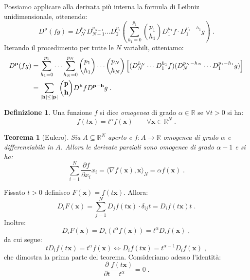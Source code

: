 \documentclass[a4paper,12pt]{report}
\theoremstyle{plain}
\newtheorem{thm}{Teorema}[section]
\theoremstyle{definition}
\newtheorem{defn}{Definizione}[section]
\theoremstyle{remark}
\numberwithin{equation}{section}
\begin{document}
Possiamo applicare alla derivata più interna la formula di Leibniz unidimensionale, ottenendo:
\begin{equation}
D^{\mathbf{p}}(fg)=D_N^{p_N}D_{N-1}^{p_{N-1}} \ldots D_2^{p_2}\left(\sum_{h_1=0}^{p_1} \binom{p_1}{h_1}D_1^{h_1}f\cdot D_1^{p_1-h_1}g\right)\;.
\end{equation}
Iterando il procedimento per tutte le $N$ variabili, otteniamo:
\begin{align}
D^{\mathbf{p}}(fg) &= \sum_{h_1=0}^{p_1}\cdots\sum_{h_N=0}^{p_N}\binom{p_1}{h_1}\cdots\binom{p_N}{h_N}\left[(D_N^{h_N}\cdots D_1^{h_1}f)(D_N^{p_N-h_N}\cdots D_1^{p_1-h_1}g)\right] \notag \\
&=\sum_{|\mathbf{h}|\le|\mathbf{p}|}\binom{\mathbf{p}}{\mathbf{h}} D^{\mathbf{h}}fD^{\mathbf{p}-\mathbf{h}}g\;.
\end{align}
\endproof
\begin{defn} Una funzione $f$ si dice \textit{omogenea} di grado $\alpha \in \mathbb{R}$ se $\forall t>0$ si ha:
\begin{equation}
f(t\mathbf{x})=t^{\alpha}f(\mathbf{x}) \qquad \forall \mathbf{x} \in \mathbb{R}^N\;.
\end{equation}
\end{defn}
\begin{thm}[Eulero] Sia $A \subseteq \mathbb{R}^N$ aperto e $f:A \to \mathbb{R}$ omogenea di grado $\alpha$ e differenziabile in $A$. Allora le derivate parziali sono omogenee di grado $\alpha -1$ e si ha:
\begin{equation}
\sum_{i=1}^N \frac{\partial{f}}{\partial{x_i}}x_i= \langle \nabla f(\mathbf{x}),\mathbf{x}\rangle_N=\alpha f(\mathbf{x})\;.
\end{equation}
\end{thm}
\proof Fissato $t>0$ definisco $F(\mathbf{x})=f(t\mathbf{x})$. Allora:
\begin{equation}
D_iF(\mathbf{x})=\sum_{j=1}^N D_jf(t\mathbf{x})\cdot \delta_{ij}t=D_if(t\mathbf{x})t\;.
\end{equation}
Inoltre:
\begin{equation}
D_iF(\mathbf{x})=D_i(t^{\alpha}f(\mathbf{x}))=t^{\alpha}D_if(\mathbf{x})\;,
\end{equation}
da cui segue:
\begin{equation}
tD_if(t\mathbf{x})=t^{\alpha}f(\mathbf{x}) \Longleftrightarrow D_if(t\mathbf{x})=t^{\alpha-1}D_if(\mathbf{x})\;,
\end{equation}
che dimostra la prima parte del teorema. Consideriamo adesso l'identità:
\begin{equation}
\frac{\partial}{\partial{t}}\frac{f(t\mathbf{x})}{t^{\alpha}}=0\;.
\end{equation}
\end{document}
